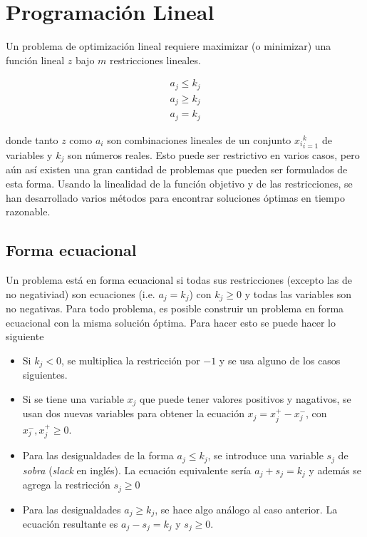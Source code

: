\chapter{Programación Lineal}\label{app:linprog}

Un problema de optimización lineal requiere maximizar (o minimizar) una función
lineal $z$ bajo $m$ restricciones lineales.

\begin{align}
  a_{j} \le k_{j}\\
  a_{j} \ge k_{j}\\
  a_{j} = k_{j}
\end{align}

donde tanto $z$ como $a_{i}$ son combinaciones lineales de un conjunto
${x_{i}}_{i=1}^{k}$ de variables y $k_{j}$ son números reales. Esto puede ser
restrictivo en varios casos, pero aún así existen una gran cantidad de problemas
que pueden ser formulados de esta forma. Usando la linealidad de la función
objetivo y de las restricciones, se han desarrollado varios métodos para
encontrar soluciones óptimas en tiempo razonable.

\section{Forma ecuacional}

Un problema está en forma ecuacional si todas sus restricciones (excepto las de
no negativiad) son ecuaciones (i.e. $a_{j} = k_{j}$) con $k_{j} \ge 0$ y todas
las variables son no negativas. Para todo problema, es posible construir un
problema en forma ecuacional con la misma solución óptima. Para hacer esto se
puede hacer lo siguiente

\begin{itemize}
  \item Si $k_{j} < 0$, se multiplica la restricción por $-1$ y se usa alguno de
        los casos siguientes.
  \item Si se tiene una variable $x_{j}$ que puede tener valores positivos y
        nagativos, se usan dos nuevas variables para obtener la ecuación
        $x_{j} = x_{j}^{+} - x_{j}^{-}$, con $x_{j}^{-}, x_{j}^{+} \ge 0$.
  \item Para las desigualdades de la forma $a_{j} \le k_{j}$, se introduce una
        variable $s_{j}$ de \emph{sobra} (\emph{slack} en inglés). La ecuación
        equivalente sería $a_{j} + s_{j} = k_{j}$ y además se agrega la
        restricción $s_{j} \ge 0$

  \item Para las desigualdades $a_{j} \ge k_{j}$, se hace algo análogo al caso
        anterior. La ecuación resultante es $a_{j} - s_{j} = k_{j}$ y $s_{j}
        \ge 0$.
\end{itemize}
